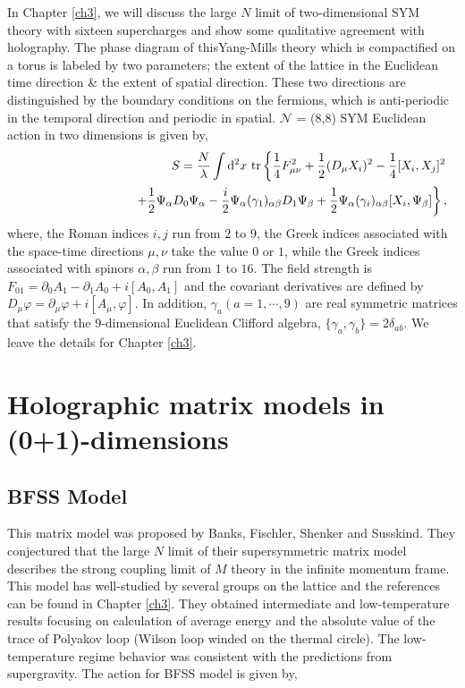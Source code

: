 In Chapter \ref{ch3}, we will discuss the large $N$ limit of two-dimensional SYM theory with sixteen supercharges
and show some qualitative agreement with holography. 
The phase diagram of thisYang-Mills theory which is compactified on a torus is labeled by two parameters; 
the extent of the lattice in the Euclidean time direction \& the extent of spatial direction. These two 
directions are distinguished by the boundary conditions on the fermions, which is anti-periodic in the
temporal direction and periodic in spatial. 
$\mathcal{N}$ = (8,8) SYM Euclidean action in two dimensions is given by, 
\begin{eqnarray}
&& 
       S=\frac{N}{\lambda}\int{}{\rm d}^2x\ {\rm tr} 
             \left\{ \frac{1}{4}F^2_{\mu\nu} 
                    + \frac{1}{2}(D_\mu X_i)^2 - \frac{1}{4}[X_i,X_j]^2  
             \right.  \nonumber \\
&& 
      \hspace{3cm} \left.
          +\frac{1}{2} \Psi_\alpha  D_0 \Psi_\alpha 
          -\frac{i}{2} \Psi_\alpha (\gamma_{1})_{\alpha \beta} D_1 \Psi_\beta 
        + \frac{1}{2}\Psi_\alpha (\gamma_i)_{\alpha \beta} [X_i, \Psi_\beta] \right\},
        \label{cont_action}
\end{eqnarray}
where, the Roman indices $i,j$ run from $2$ to $9$, 
the Greek indices associated with the space-time directions $\mu,\nu$ take the value $0$ or $1$,
while the Greek indices associated with spinors $\alpha, \beta$ run from $1$ to $16$. 
The field strength is $F_{01} = \partial_0 A_1 - \partial_1 A_0 +i[A_0,A_1]$ and the covariant derivatives are 
defined by $D_\mu \varphi = \partial_\mu \varphi + i[A_\mu, \varphi]$.  
In addition, $\gamma_a(a=1,\cdots,9)$ are real symmetric matrices that satisfy the 9-dimensional Euclidean Clifford algebra,
$\{\gamma_a,\gamma_b\}=2\delta_{ab}$. We leave the details for Chapter \ref{ch3}. 



\section{Holographic matrix models in (0+1)-dimensions} 
  


\subsection{BFSS Model}

This matrix model was proposed by Banks, Fischler, Shenker and Susskind. They conjectured that the large $N$ limit of their 
supersymmetric matrix model describes the strong coupling limit of $M$ theory in the infinite momentum frame. 
This model has well-studied by several groups on the lattice and the references can be 
found in Chapter \ref{ch3}. They obtained intermediate and low-temperature results focusing on calculation of average 
energy and the absolute value of the trace of Polyakov loop (Wilson loop winded on the thermal circle). 
The low-temperature regime behavior was consistent with the predictions from supergravity. 
The action for BFSS model is given by, 

